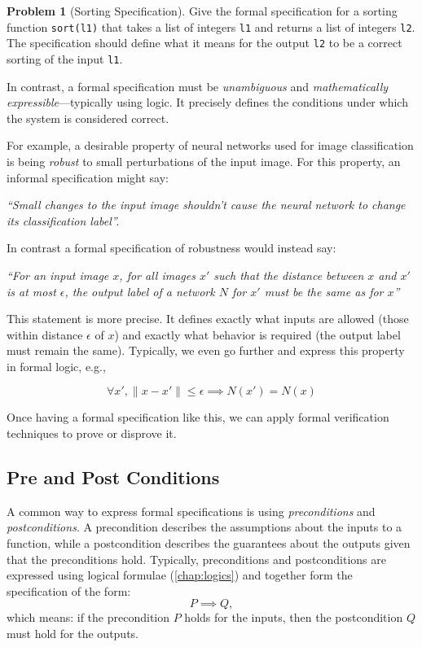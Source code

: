 \documentclass[oneside,11pt,dvipsnames]{book}
\numberwithin{equation}{section}
\theoremstyle{definition}
\newtheorem{problem}{Problem}[section]
\theoremstyle{remark}
\newcommand{\code}[1]{\texttt{#1}}
\begin{document}
\begin{problem}[Sorting Specification] 
    Give the formal specification for a sorting function \code{sort(l1)} that takes a list of integers \code{l1} and returns a list of integers \code{l2}. The specification should define what it means for the output \code{l2} to be a correct sorting of the input \code{l1}.
\end{problem}    

In contrast, a formal specification must be \emph{unambiguous} and \emph{mathematically expressible}---typically using logic. It precisely defines the conditions under which the system is considered correct.

For example, a desirable property of neural networks used for image classification is being \emph{robust} to small perturbations of the input image.  For this property, an informal specification might say:

\emph{``Small changes to the input image shouldn't cause the neural network to change its classification label''. }

In contrast a formal specification of robustness would instead say:

\emph{``For an input image $x$, for all images $x'$ such that the distance between $x$ and $x'$ is at most $\epsilon$, the output label of a network $N$ for $x'$ must be the same as for $x$''}

This statement is more precise. It defines exactly what inputs are allowed (those within distance $\epsilon$ of $x$) and exactly what behavior is required (the output label must remain the same). Typically, we even go further and express this property in formal logic, e.g.,

\begin{equation}\label{eq:robustness}
\forall x', \|x - x'\| \leq \epsilon \implies N(x') = N(x)
\end{equation}

Once having a formal specification like this, we can apply formal verification techniques to prove or disprove it.


\subsection{Pre and Post Conditions}
A common way to express formal specifications is using \emph{preconditions} and \emph{postconditions}. A precondition describes the assumptions about the inputs to a function, while a postcondition describes the guarantees about the outputs given that the preconditions hold. Typically, preconditions and postconditions are expressed using logical formulae (\autoref{chap:logics}) and together form the specification of the form: 
\begin{equation}
P \implies Q,
\end{equation}
which means: if the precondition $P$ holds for the inputs, then the postcondition $Q$ must hold for the outputs.
\end{document}
